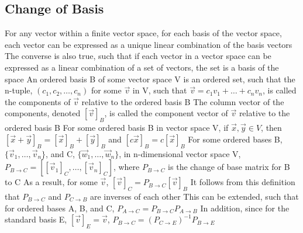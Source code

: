 \documentclass[11 pt, twoside]{article}
\newenvironment{outline*}
{
	\begin{outline}[enumerate]
	}
	{\end{outline}
}
\begin{document}
\subsection{Change of Basis}
\begin{outline*}
\1 For any vector within a finite vector space, for each basis of the vector space, each vector can be expressed as a unique linear combination of the basis vectors
\2 The converse is also true, such that if each vector in a vector space can be expressed as a linear combination of a set of vectors, the set is a basis of the space
\1 An ordered basis B of some vector space V is an ordered set, such that the n-tuple, $(c_1, c_2, \dots, c_n)$ for some $\vec{v}$ in V, such that $\vec{v} = c_1v_1 + \dots + c_nv_n$, is called the components of $\vec{v}$ relative to the ordered basis B
\2 The column vector of the components, denoted $[\vec{v}]_B$, is called the component vector of  $\vec{v}$ relative to the ordered basis B
\1 For some ordered basis B in vector space V, if $\vec{x}, \vec{y} \in V$, then $[\vec{x} + \vec{y}]_B = [\vec{x}]_B + [\vec{y}]_B$ and $[c\vec{x}]_B = c[\vec{x}]_B$
\1 For some ordered bases B, $\{\vec{v}_1, \dots, \vec{v}_n\}$, and C, $\{\vec{w}_1, \dots, \vec{w}_n\}$, in n-dimensional vector space V, $P_{B \to C} = [[\vec{v}_1]_C, \dots, [\vec{v}_n]_C]$, where $P_{B \to C}$ is the change of base matrix for B to C
\2 As a result, for some $\vec{v}$, $[\vec{v}]_C = P_{B \to C}[\vec{v}]_B$
\2 It follows from this definition that $P_{B \to C}$ and $P_{C \to B}$ are inverses of each other
\3 This can be extended, such that for ordered bases A, B, and C, $P_{A \to C} = P_{B \to C}P_{A \to B}$
\3 In addition, since for the standard basis E, $[\vec{v}]_E = \vec{v}$, $P_{B \to C} = (P_{C \to E})^{-1}P_{B \to E}$
\end{outline*}
\end{document}

